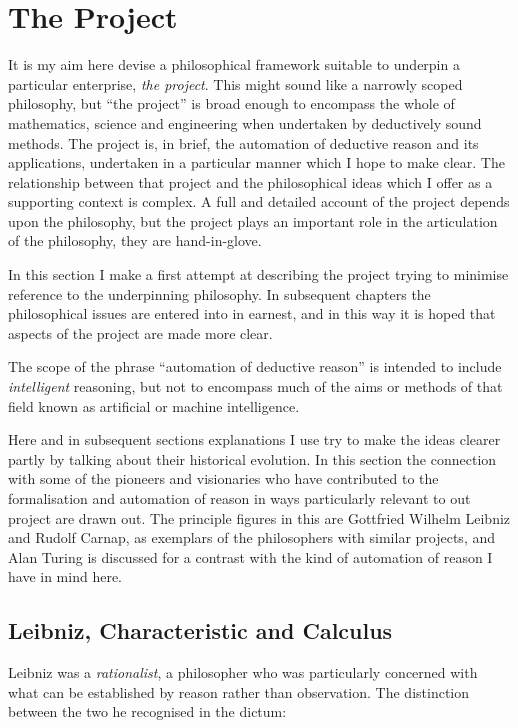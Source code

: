 \def\rbjidtheproject{$$Id: theproject.tex,v 1.4 2011/11/29 16:45:35 rbj Exp $$}

\chapter{The Project}\label{TheProject}

It is my aim here devise a philosophical framework suitable to underpin a particular enterprise, \emph{the project}.
This might sound like a narrowly scoped philosophy, but ``the project'' is broad enough to encompass the whole of mathematics, science and engineering when undertaken by deductively sound methods.
The project is, in brief, the automation of deductive reason and its applications, undertaken in a particular manner which I hope to make clear.
The relationship between that project and the philosophical ideas which I offer as a supporting context is complex.
A full and detailed account of the project depends upon the philosophy, but the project plays an important role in the articulation of the philosophy, they are hand-in-glove.

In this section I make a first attempt at describing the project trying to minimise reference to the underpinning philosophy.
In subsequent chapters the philosophical issues are entered into in earnest, and in this way it is hoped that aspects of the project are made more clear.

The scope of the phrase ``automation of deductive reason'' is intended to include \emph{intelligent} reasoning, but not to encompass much of the aims or methods of that field known as artificial or machine intelligence.

Here and in subsequent sections explanations I use try to make the ideas clearer partly by talking about their historical evolution.
In this section the connection with some of the pioneers and visionaries who have contributed to the formalisation and automation of reason in ways particularly relevant to out project are drawn out.
The principle figures in this are Gottfried Wilhelm Leibniz and Rudolf Carnap, as exemplars of the philosophers with similar projects, and Alan Turing is discussed for a contrast with the kind of automation of reason I have in mind here.

\section{Leibniz, Characteristic and Calculus}

Leibniz was a \emph{rationalist}, a philosopher who was particularly concerned with what can be established by reason rather than observation.
The distinction between the two he recognised in the dictum:

